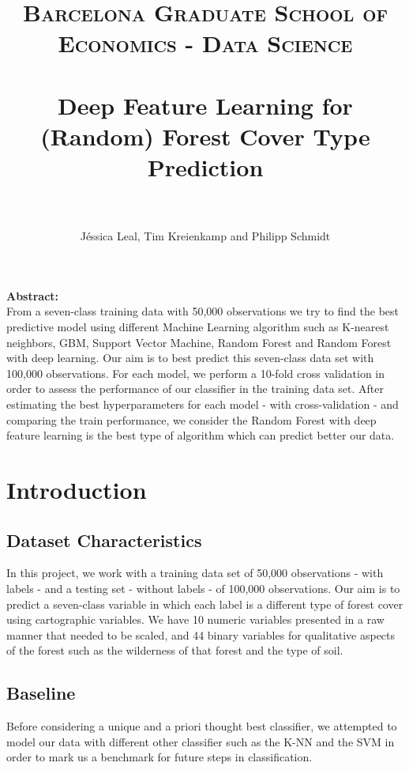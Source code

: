 \documentclass[paper=a4, fontsize=12pt]{scrartcl}
\title{	
\normalfont \normalsize 
\textsc{Barcelona Graduate School of Economics - Data Science} \\ [25pt]
\horrule{2pt} \\[0.5cm] 
\huge Deep Feature Learning for (Random) Forest Cover Type Prediction  \\ 
\horrule{2pt} \\[0.5cm] 
}
\author{J\'essica Leal, Tim Kreienkamp and Philipp Schmidt}
\date{}
\numberwithin{equation}{section}
\numberwithin{figure}{section}
\numberwithin{table}{section}
\begin{document}


\maketitle
\textbf{Abstract:} \\
From a seven-class training data with 50,000 observations we try to find the best predictive model using different Machine Learning algorithm such as K-nearest neighbors, GBM, Support Vector Machine, Random Forest and Random Forest with deep learning. Our aim is to best predict this seven-class data set with 100,000 observations. For each model, we perform a 10-fold cross validation in order to assess the performance of our classifier in the training data set. After estimating the best hyperparameters for each model - with cross-validation - and comparing the train performance, we consider the Random Forest with deep feature learning is the best type of algorithm which can predict better our data. 





\section{Introduction}
\subsection{Dataset Characteristics}
In this project, we work with a training data set of 50,000 observations - with labels - and a testing set - without labels - of 100,000 observations. Our aim is to predict a seven-class variable in which each label is a different type of forest cover using cartographic variables. We have 10 numeric variables presented in a raw manner that needed to be scaled, and 44 binary variables for qualitative aspects of the forest such as the wilderness of that forest and the type of soil. 

\subsection{Baseline}
Before considering a unique and a priori thought best classifier, we attempted to model our data with different other classifier such as the K-NN and the SVM in order to mark us a benchmark for future steps in classification.
\end{document}
